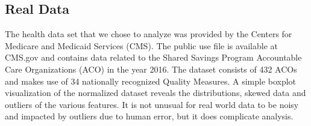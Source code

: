 \documentclass[conference]{IEEEtran}
\begin{document}

\subsection{Real Data}

The health data set that we chose to analyze was provided by the Centers for Medicare and Medicaid Services (CMS). The public use file is available at CMS.gov and contains data related to the Shared Savings Program Accountable Care Organizations (ACO) in the year 2016. The dataset consists of 432 ACOs and makes use of 34 nationally recognized Quality Measures.  A simple boxplot visualization of the normalized dataset reveals the distributions, skewed data and outliers of the various features. It is not unusual for real world data to be noisy and impacted by outliers due to human error, but it does complicate analysis.\\
\end{document}
